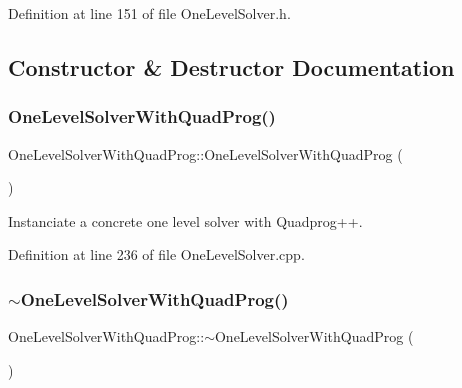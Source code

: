 Definition at line 151 of file One\+Level\+Solver.\+h.



\subsection{Constructor \& Destructor Documentation}
\hypertarget{classocra_1_1OneLevelSolverWithQuadProg_a0d7f639dd36c79056c264f0c09d5be50}{}\label{classocra_1_1OneLevelSolverWithQuadProg_a0d7f639dd36c79056c264f0c09d5be50} 
\subsubsection{\texorpdfstring{One\+Level\+Solver\+With\+Quad\+Prog()}{OneLevelSolverWithQuadProg()}}
{\footnotesize\ttfamily One\+Level\+Solver\+With\+Quad\+Prog\+::\+One\+Level\+Solver\+With\+Quad\+Prog (\begin{DoxyParamCaption}{ }\end{DoxyParamCaption})}

Instanciate a concrete one level solver with Quadprog++. 

Definition at line 236 of file One\+Level\+Solver.\+cpp.

\hypertarget{classocra_1_1OneLevelSolverWithQuadProg_a27d12b82fcaec15ca7041064bd7f9095}{}\label{classocra_1_1OneLevelSolverWithQuadProg_a27d12b82fcaec15ca7041064bd7f9095} 
\subsubsection{\texorpdfstring{$\sim$\+One\+Level\+Solver\+With\+Quad\+Prog()}{~OneLevelSolverWithQuadProg()}}
{\footnotesize\ttfamily One\+Level\+Solver\+With\+Quad\+Prog\+::$\sim$\+One\+Level\+Solver\+With\+Quad\+Prog (\begin{DoxyParamCaption}{ }\end{DoxyParamCaption})\hspace{0.3cm}{\ttfamily [virtual]}}

